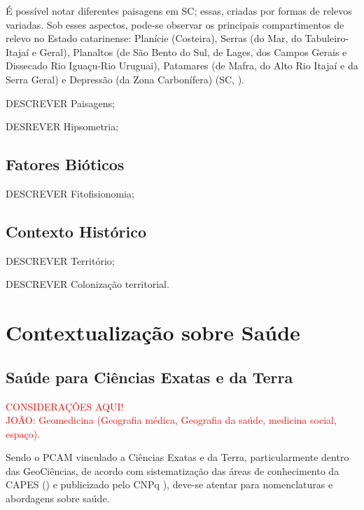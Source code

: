 \indent É possível notar diferentes paisagens em \acrlong{SC}; essas, criadas por formas de relevos variadas. Sob esses aspectos, pode-se observar os principais compartimentos de relevo no Estado catarinense: Planície (Costeira), Serras (do Mar, do Tabuleiro-Itajaí e Geral), Planaltos (de São Bento do Sul, de Lages, dos Campos Gerais e Dissecado Rio Iguaçu-Rio Uruguai), Patamares (de Mafra, do Alto Rio Itajaí e da Serra Geral) e Depressão (da Zona Carbonífera) (\acrlong{SC}, \citeyear{AtlasSCnatureza}).

\indent DESCREVER Paisagens;

\indent DESREVER Hipsometria;

\subsection{Fatores Bióticos}

\indent DESCREVER Fitofisionomia;

\subsection{Contexto Histórico}

\indent DESCREVER Território;

\indent DESCREVER Colonização territorial.

\section{Contextualização sobre Saúde}

\subsection{Saúde para Ciências Exatas e da Terra}

\begin{center}
\textcolor{red}{CONSIDERAÇÕES AQUI!}\\
\textcolor{red}{JOÃO: Geomedicina (Geografia médica, Geografia da saúde, medicina social, espaço).}\\
\end{center}

\indent Sendo o \acrfull{PCAM} vinculado a Ciências Exatas e da Terra, particularmente dentro das GeoCiências, de acordo com sistematização das áreas de conhecimento da \acrfull{CAPES} (\citeyear{CAPES_Tabela_Conhecimento}) e publicizado pelo \acrfull{CNPq} \citeyear{CNPq_Tabela_Conhecimento}), deve-se atentar para nomenclaturas e abordagens sobre saúde.


